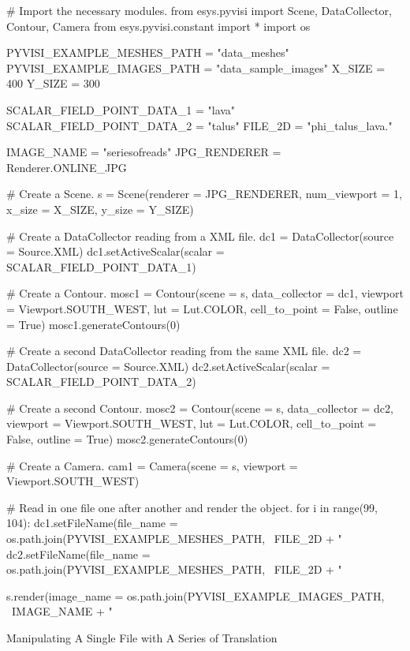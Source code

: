 \begin{python}
# Import the necessary modules.
from esys.pyvisi import Scene, DataCollector, Contour, Camera 
from esys.pyvisi.constant import *
import os

PYVISI_EXAMPLE_MESHES_PATH = "data_meshes"
PYVISI_EXAMPLE_IMAGES_PATH = "data_sample_images"
X_SIZE = 400
Y_SIZE = 300

SCALAR_FIELD_POINT_DATA_1 = "lava"
SCALAR_FIELD_POINT_DATA_2 = "talus"
FILE_2D = "phi_talus_lava."

IMAGE_NAME = "seriesofreads"
JPG_RENDERER = Renderer.ONLINE_JPG

# Create a Scene.
s = Scene(renderer = JPG_RENDERER, num_viewport = 1, x_size = X_SIZE, 
        y_size = Y_SIZE)

# Create a DataCollector reading from a XML file. 
dc1 = DataCollector(source = Source.XML)
dc1.setActiveScalar(scalar = SCALAR_FIELD_POINT_DATA_1)

# Create a Contour.
mosc1 = Contour(scene = s, data_collector = dc1, 
        viewport = Viewport.SOUTH_WEST, lut = Lut.COLOR, cell_to_point = False,
        outline = True)
mosc1.generateContours(0)

# Create a second DataCollector reading from the same XML file. 
dc2 = DataCollector(source = Source.XML)
dc2.setActiveScalar(scalar = SCALAR_FIELD_POINT_DATA_2)

# Create a second Contour.
mosc2 = Contour(scene = s, data_collector = dc2, 
        viewport = Viewport.SOUTH_WEST, lut = Lut.COLOR, cell_to_point = False,
        outline = True)
mosc2.generateContours(0)

# Create a Camera.
cam1 = Camera(scene = s, viewport = Viewport.SOUTH_WEST)

# Read in one file one after another and render the object. 
for i in range(99, 104):
    dc1.setFileName(file_name =  os.path.join(PYVISI_EXAMPLE_MESHES_PATH, \
	        FILE_2D + "%
    dc2.setFileName(file_name =  os.path.join(PYVISI_EXAMPLE_MESHES_PATH, \
            FILE_2D + "%

    s.render(image_name = os.path.join(PYVISI_EXAMPLE_IMAGES_PATH, \
            IMAGE_NAME + "%
\end{python}

\textsf{Manipulating A Single File with A Series of Translation}

\begin{python}

\end{python}

